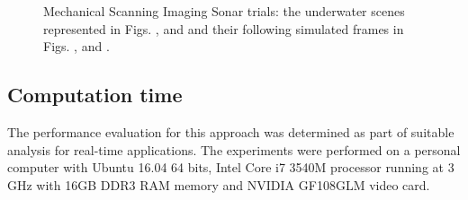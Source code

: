 \documentclass[final,5p,times]{elsarticle}
\begin{document}
\begin{figure}[!h]
{        \label{fig:msis_sim2}
    }
    \captionsetup{justification=centering}
    \caption{Mechanical Scanning Imaging Sonar trials: the underwater scenes represented in Figs. ,  and  and their following simulated frames in Figs. ,  and .}
    \label{fig:msis}
\end{figure}


\subsection{Computation time}

The performance evaluation for this approach was determined as part of suitable analysis for real-time applications. The experiments were performed on a personal computer with Ubuntu 16.04 64 bits, Intel Core i7 3540M processor running at 3 GHz with 16GB DDR3 RAM memory and NVIDIA GF108GLM video card.
\end{document}
